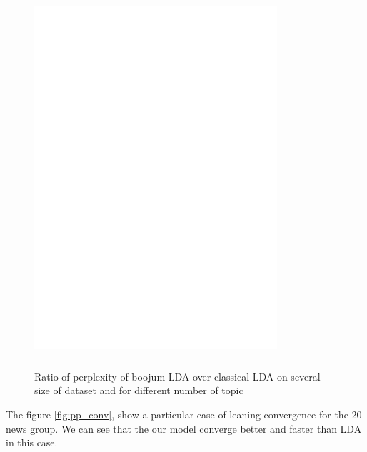 \begin{figure}[h]
\label{fig:pp_D}
\includegraphics[width=9cm, height=14cm]{results/pp_D.eps}
\caption{Ratio of perplexity of boojum LDA over classical LDA on several size of dataset and for different number of topic}
\end{figure}

The figure \ref{fig:pp_conv}, show a particular case of leaning convergence for the 20 news group. We can see that the our model converge better and faster than LDA in this case. 

